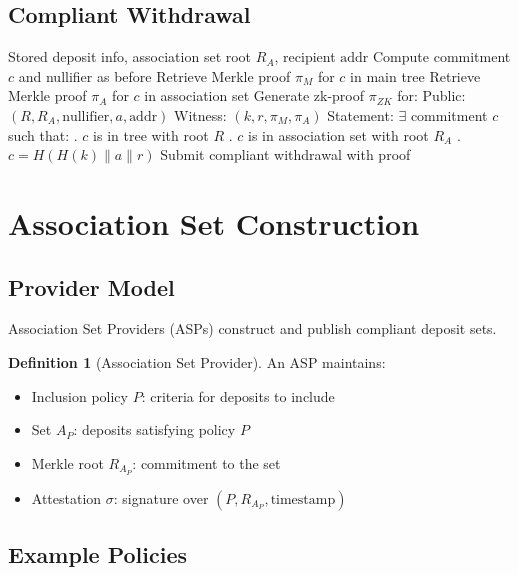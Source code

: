 \documentclass[11pt,a4paper]{article}
\theoremstyle{definition}
\newtheorem{definition}{Definition}
\begin{document}
\subsection{Compliant Withdrawal}

\begin{algorithm}
\caption{Compliant Withdrawal with Association Set}
\begin{algorithmic}[1]
\Require Stored deposit info, association set root $R_A$, recipient $\text{addr}$
\State Compute commitment $c$ and nullifier as before
\State Retrieve Merkle proof $\pi_M$ for $c$ in main tree
\State Retrieve Merkle proof $\pi_A$ for $c$ in association set
\State Generate zk-proof $\pi_{ZK}$ for:
\Statex \quad Public: $(R, R_A, \text{nullifier}, a, \text{addr})$
\Statex \quad Witness: $(k, r, \pi_M, \pi_A)$
\Statex \quad Statement: $\exists$ commitment $c$ such that:
\Statex \quad{}. $c$ is in tree with root $R$
\Statex \quad{}. $c$ is in association set with root $R_A$
\Statex \quad{}. $c = H(H(k) \| a \| r)$
\State Submit compliant withdrawal with proof
\end{algorithmic}
\end{algorithm}

\section{Association Set Construction}

\subsection{Provider Model}

Association Set Providers (ASPs) construct and publish compliant deposit sets.

\begin{definition}[Association Set Provider]
An ASP maintains:
\begin{itemize}
    \item Inclusion policy $P$: criteria for deposits to include
    \item Set $A_P$: deposits satisfying policy $P$
    \item Merkle root $R_{A_P}$: commitment to the set
    \item Attestation $\sigma$: signature over $(P, R_{A_P}, \text{timestamp})$
\end{itemize}
\end{definition}

\subsection{Example Policies}
\end{document}
